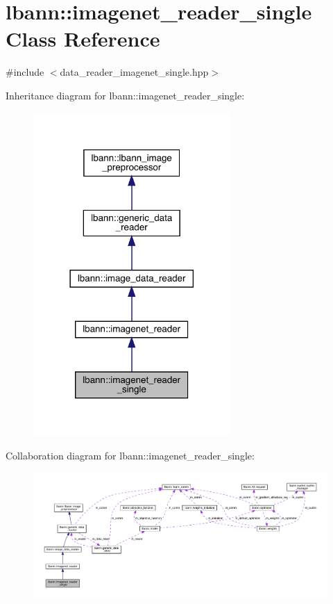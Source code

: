 \hypertarget{classlbann_1_1imagenet__reader__single}{}\section{lbann\+:\+:imagenet\+\_\+reader\+\_\+single Class Reference}
\label{classlbann_1_1imagenet__reader__single}


{\ttfamily \#include $<$data\+\_\+reader\+\_\+imagenet\+\_\+single.\+hpp$>$}



Inheritance diagram for lbann\+:\+:imagenet\+\_\+reader\+\_\+single\+:\nopagebreak
\begin{figure}[H]
\begin{center}
\leavevmode
\includegraphics[width=213pt]{classlbann_1_1imagenet__reader__single__inherit__graph}
\end{center}
\end{figure}


Collaboration diagram for lbann\+:\+:imagenet\+\_\+reader\+\_\+single\+:\nopagebreak
\begin{figure}[H]
\begin{center}
\leavevmode
\includegraphics[width=350pt]{classlbann_1_1imagenet__reader__single__coll__graph}
\end{center}
\end{figure}
